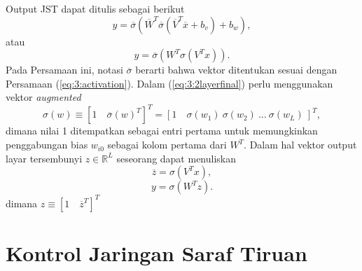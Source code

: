 \noindent Output JST dapat ditulis sebagai berikut
\begin{equation} \label{eq:3:2layer}
y = \overline{\sigma}
\left(
	\overline{W}^T\overline{\sigma}(\overline{V}^T\overline{x}+b_v)+b_w
\right),
\end{equation}
atau
\begin{equation} \label{eq:3:2layerfinal}
y = \overline{\sigma}
\left(
	W^T\sigma(V^Tx)
\right).
\end{equation}
Pada Persamaan ini, notasi $\overline{\sigma}$ berarti bahwa vektor ditentukan sesuai dengan Persamaan (\ref{eq:3:activation}). Dalam (\ref{eq:3:2layerfinal}) perlu menggunakan vektor \textit{augmented}
\begin{equation} \label{eq:3:augVector}
\sigma(w) \equiv [1\quad \overline{\sigma}(w)^T]^T = [1\quad \sigma(w_1)\ \sigma(w_2)\ \dots\ \sigma(w_L)\ ]^T,
\end{equation}
\noindent dimana nilai 1 ditempatkan sebagai entri pertama untuk memungkinkan penggabungan bias $w_{i0}$ sebagai kolom pertama dari $W^T$. Dalam hal vektor output layar tersembunyi $z\in \mathbb{R}^L$ seseorang dapat menuliskan
\begin{equation} \label{eq:3:final19}
\overline{z} = \sigma(V^Tx),
\end{equation}
\begin{equation} \label{eq:3:final20}
y = \sigma(W^Tz).
\end{equation}
\noindent dimana $z \equiv [1\quad \overline{z}^T]^T$

\break
\break
\break
\break

\section{Kontrol Jaringan Saraf Tiruan}

